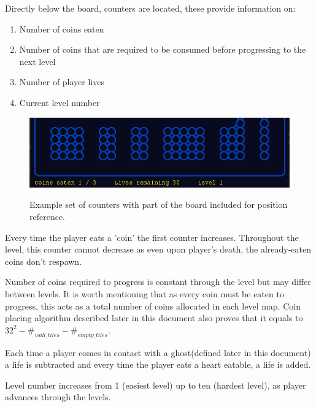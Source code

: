 \documentclass[11pt,a4paper,notitlepage]{report}
\newenvironment{img}{
	\begin{center}
		\begin{figure}[H]
			\begin{center}
			
}{
	\end{center}
		\end{figure}
			\end{center}
}
\begin{document}
				Directly below the board, counters are located, these provide information on:
				\begin{enumerate}
					\item
						Number of coins eaten
					\item
						Number of coins that are required to be consumed before progressing to the next level
					\item
						Number of player lives
					\item
						Current level number
				\end{enumerate}
				\begin{img}
					\includegraphics[width=350pt]{images/counter_example}\\
					\caption{Example set of counters with part of the board included for position reference.}
				\end{img}
				Every time the player eats a 'coin' the first counter increases. Throughout the level, this counter cannot decrease as even upon player's death, the already-eaten coins don't respawn.
				
				Number of coins required to progress is constant through the level but may differ between levels. It is worth mentioning that as every coin must be eaten to progress, this acts as a total number of coins allocated in each level map. Coin placing algorithm described later in this document also proves that it equals to $32^2-\#_{wall\_tiles}-\#_{empty\_ tiles}$.
				
				Each time a player comes in contact with a ghost(defined later in this document) a life is subtracted and every time the player eats a heart eatable, a life is added.
				
				Level number increases from 1 (easiest level) up to ten (hardest level), as player advances through the levels.
\end{document}
